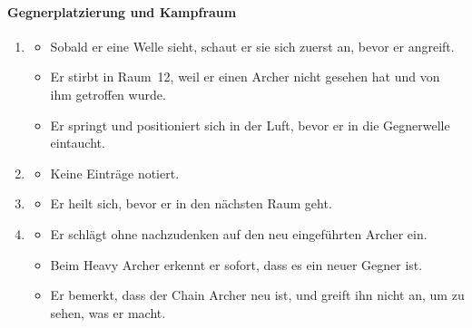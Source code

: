 \documentclass[../Main.tex]{subfiles}
\begin{document}
\paragraph{Gegnerplatzierung und Kampfraum}
\begin{enumerate}[label=\textbf{B\arabic*}, leftmargin=1.5cm, itemsep=0.8em, resume]
\item
\begin{itemize}[nosep]
    \item Sobald er eine Welle sieht, schaut er sie sich zuerst an, bevor er angreift.
    \item Er stirbt in Raum~12, weil er einen Archer nicht gesehen hat und von ihm getroffen wurde.
    \item Er springt und positioniert sich in der Luft, bevor er in die Gegnerwelle eintaucht.
\end{itemize}
\item
\begin{itemize}[nosep]
    \item Keine Einträge notiert.
\end{itemize}
\item
\begin{itemize}[nosep]
    \item Er heilt sich, bevor er in den nächsten Raum geht.
\end{itemize}
\item
\begin{itemize}[nosep]
    \item Er schlägt ohne nachzudenken auf den neu eingeführten Archer ein.
    \item Beim Heavy Archer erkennt er sofort, dass es ein neuer Gegner ist.
    \item Er bemerkt, dass der Chain Archer neu ist, und greift ihn nicht an, um zu sehen, was er macht.
\end{itemize}
\end{enumerate}
\end{document}
